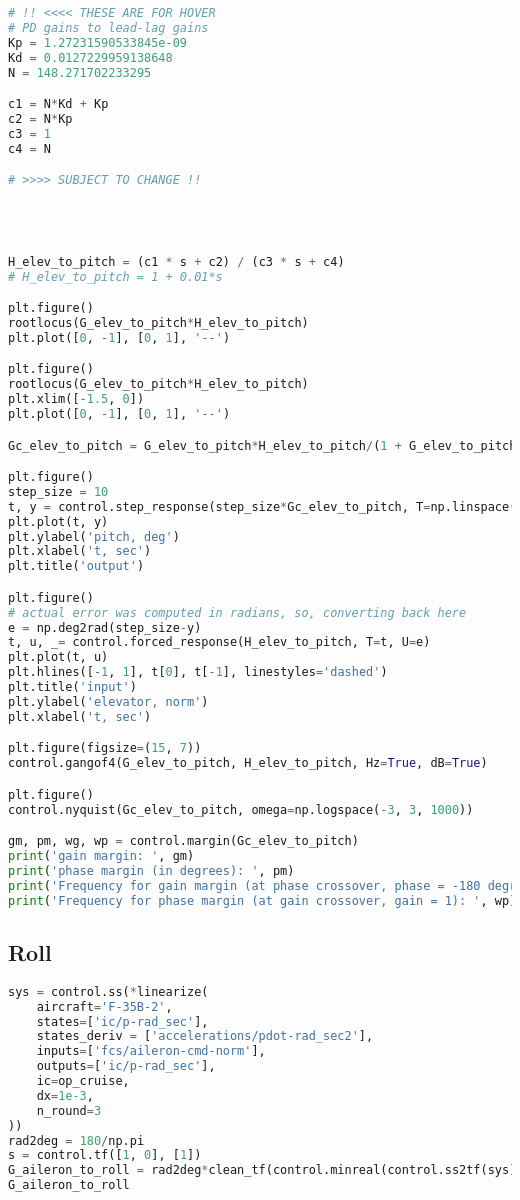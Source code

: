 \begin{lstlisting}[language=Python]
# !! <<<< THESE ARE FOR HOVER 
# PD gains to lead-lag gains 
Kp = 1.27231590533845e-09
Kd = 0.0127229959138648
N = 148.271702233295

c1 = N*Kd + Kp
c2 = N*Kp
c3 = 1
c4 = N

# >>>> SUBJECT TO CHANGE !!




H_elev_to_pitch = (c1 * s + c2) / (c3 * s + c4)
# H_elev_to_pitch = 1 + 0.01*s

plt.figure()
rootlocus(G_elev_to_pitch*H_elev_to_pitch)
plt.plot([0, -1], [0, 1], '--')

plt.figure()
rootlocus(G_elev_to_pitch*H_elev_to_pitch)
plt.xlim([-1.5, 0])
plt.plot([0, -1], [0, 1], '--')

Gc_elev_to_pitch = G_elev_to_pitch*H_elev_to_pitch/(1 + G_elev_to_pitch*H_elev_to_pitch)

plt.figure()
step_size = 10
t, y = control.step_response(step_size*Gc_elev_to_pitch, T=np.linspace(0, 30, 1000))
plt.plot(t, y)
plt.ylabel('pitch, deg')
plt.xlabel('t, sec')
plt.title('output')

plt.figure()
# actual error was computed in radians, so, converting back here
e = np.deg2rad(step_size-y)
t, u, _= control.forced_response(H_elev_to_pitch, T=t, U=e)
plt.plot(t, u)
plt.hlines([-1, 1], t[0], t[-1], linestyles='dashed')
plt.title('input')
plt.ylabel('elevator, norm')
plt.xlabel('t, sec')

plt.figure(figsize=(15, 7))
control.gangof4(G_elev_to_pitch, H_elev_to_pitch, Hz=True, dB=True)

plt.figure()
control.nyquist(Gc_elev_to_pitch, omega=np.logspace(-3, 3, 1000))

gm, pm, wg, wp = control.margin(Gc_elev_to_pitch)
print('gain margin: ', gm)
print('phase margin (in degrees): ', pm)
print('Frequency for gain margin (at phase crossover, phase = -180 degrees): ', wg)
print('Frequency for phase margin (at gain crossover, gain = 1): ', wp)
\end{lstlisting}

\hypertarget{roll-1}{%
\subsection{Roll}\label{roll-1}}

\begin{lstlisting}[language=Python]
sys = control.ss(*linearize(
    aircraft='F-35B-2',
    states=['ic/p-rad_sec'],
    states_deriv = ['accelerations/pdot-rad_sec2'],
    inputs=['fcs/aileron-cmd-norm'],
    outputs=['ic/p-rad_sec'],
    ic=op_cruise,
    dx=1e-3,
    n_round=3
))
rad2deg = 180/np.pi
s = control.tf([1, 0], [1])
G_aileron_to_roll = rad2deg*clean_tf(control.minreal(control.ss2tf(sys), 1e-3))/s
G_aileron_to_roll
\end{lstlisting}


